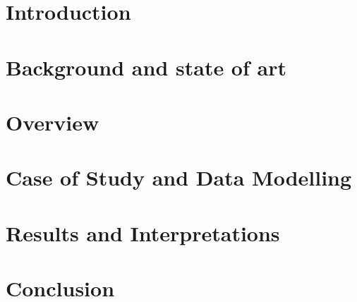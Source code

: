 \documentclass{Configuration_Files/PoliMi3i_thesis}
\begin{document}
\thispagestyle{empty}
\tableofcontents %
\thispagestyle{empty}
\cleardoublepage
\mainmatter %

\chapter{Introduction}
 

\chapter{Background and state of art}
\label{chap:background}


\chapter{Overview}
 \label{chap:Overview}
 

\chapter{Case of Study and Data Modelling }
\label{chap:case}


\chapter{Results and Interpretations }
 \label{chap:res}


\chapter{Conclusion}
\label{chap:conclusion}





\end{document}

